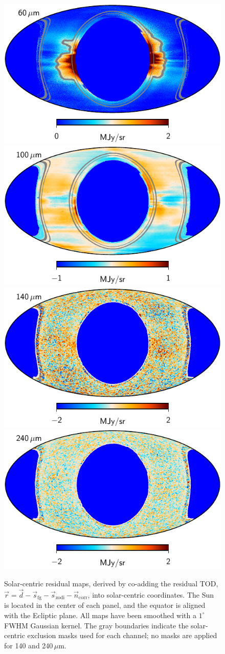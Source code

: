 \documentclass{aa}
\newcommand{\dv}[0]{\vec{d}}
\newcommand{\n}[0]{\vec{n}}
\newcommand{\s}[0]{\vec{s}}
\renewcommand{\r}[0]{\vec{r}}
\begin{document}
\begin{figure}
  \includegraphics[width=0.40\linewidth]{figs/solarmap_07_v2.pdf}\hspace*{5mm}
  \includegraphics[width=0.40\linewidth]{figs/solarmap_08_v2.pdf}\\
  \includegraphics[width=0.40\linewidth]{figs/solarmap_09_v2.pdf}\hspace*{5mm}
  \includegraphics[width=0.40\linewidth]{figs/solarmap_10_v2.pdf}
  \caption{Solar-centric residual maps, derived by co-adding the residual TOD, $\r = \dv - \s_{\mathrm{fg}} - \s_{\mathrm{zodi}} - \n_{\mathrm{corr}}$, into solar-centric coordinates. The Sun is located in the center of each panel, and the equator is aligned with the Ecliptic plane. All maps have been smoothed with a $1^{\circ}$ FWHM Gaussian kernel. The gray boundaries indicate the solar-centric exclusion masks used for each channel; no masks are applied for 140 and 240\,$\mu$m.}
  \label{fig:solarmaps}
\end{figure}


\end{document}
